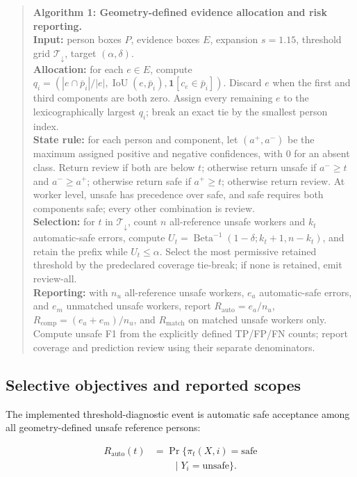 \documentclass[iicol,pdflatex,sn-mathphys-num]{sn-jnl}
\begin{document}
\begin{quote}
\small
\textbf{Algorithm 1: Geometry-defined evidence allocation and risk reporting.}\\
\textbf{Input:} person boxes $P$, evidence boxes $E$, expansion $s=1.15$, threshold grid $\mathcal{T}_{\downarrow}$, target $(\alpha,\delta)$.\\
\textbf{Allocation:} for each $e\in E$, compute $q_i=(|e\cap\bar p_i|/|e|,\operatorname{IoU}(e,\bar p_i),\mathbf{1}[c_e\in\bar p_i])$. Discard $e$ when the first and third components are both zero. Assign every remaining $e$ to the lexicographically largest $q_i$; break an exact tie by the smallest person index.\\
\textbf{State rule:} for each person and component, let $(a^+,a^-)$ be the maximum assigned positive and negative confidences, with $0$ for an absent class. Return review if both are below $t$; otherwise return unsafe if $a^-\geq t$ and $a^-\geq a^+$; otherwise return safe if $a^+\geq t$; otherwise return review. At worker level, unsafe has precedence over safe, and safe requires both components safe; every other combination is review.\\
\textbf{Selection:} for $t$ in $\mathcal{T}_{\downarrow}$, count $n$ all-reference unsafe workers and $k_t$ automatic-safe errors, compute $U_t=\operatorname{Beta}^{-1}(1-\delta;k_t+1,n-k_t)$, and retain the prefix while $U_t\leq\alpha$. Select the most permissive retained threshold by the predeclared coverage tie-break; if none is retained, emit review-all.\\
\textbf{Reporting:} with $n_u$ all-reference unsafe workers, $e_a$ automatic-safe errors, and $e_m$ unmatched unsafe workers, report $R_{\mathrm{auto}}=e_a/n_u$, $R_{\mathrm{comp}}=(e_a+e_m)/n_u$, and $R_{\mathrm{match}}$ on matched unsafe workers only. Compute unsafe F1 from the explicitly defined TP/FP/FN counts; report coverage and prediction review using their separate denominators.\\
\end{quote}

\subsection{Selective objectives and reported scopes}

The implemented threshold-diagnostic event is automatic safe acceptance among all geometry-defined unsafe reference persons:

\begin{equation}
\begin{aligned}
R_{\mathrm{auto}}(t)
&=\Pr\{\pi_t(X,i)=\mathrm{safe}\\
&\qquad\mid Y_i=\mathrm{unsafe}\}.
\end{aligned}
\label{eq:risk}
\end{equation}
\end{document}
